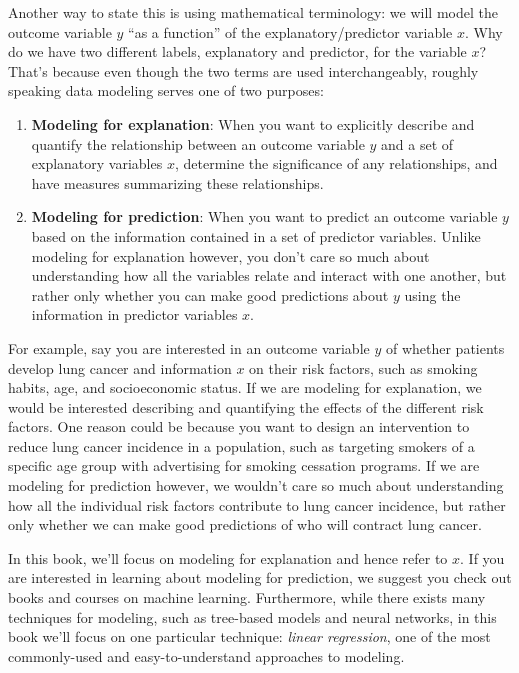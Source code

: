 \documentclass[12pt, krantz2,]{krantz}
\providecommand{\tightlist}{%
  \setlength{\itemsep}{0pt}\setlength{\parskip}{0pt}}
\begin{document}
Another way to state this is using mathematical terminology: we will model the outcome variable \(y\) ``as a function'' of the explanatory/predictor variable \(x\). Why do we have two different labels, explanatory and predictor, for the variable \(x\)? That's because even though the two terms are used interchangeably, roughly speaking data modeling serves one of two purposes:

\begin{enumerate}
\def\labelenumi{\arabic{enumi}.}
\tightlist
\item
  \textbf{Modeling for explanation}: When you want to explicitly describe and quantify the relationship between an outcome variable \(y\) and a set of explanatory variables \(x\), determine the significance of any relationships, and have measures summarizing these relationships.
\item
  \textbf{Modeling for prediction}: When you want to predict an outcome variable \(y\) based on the information contained in a set of predictor variables. Unlike modeling for explanation however, you don't care so much about understanding how all the variables relate and interact with one another, but rather only whether you can make good predictions about \(y\) using the information in predictor variables \(x\).
\end{enumerate}

For example, say you are interested in an outcome variable \(y\) of whether patients develop lung cancer and information \(x\) on their risk factors, such as smoking habits, age, and socioeconomic status. If we are modeling for explanation, we would be interested describing and quantifying the effects of the different risk factors. One reason could be because you want to design an intervention to reduce lung cancer incidence in a population, such as targeting smokers of a specific age group with advertising for smoking cessation programs. If we are modeling for prediction however, we wouldn't care so much about understanding how all the individual risk factors contribute to lung cancer incidence, but rather only whether we can make good predictions of who will contract lung cancer.

In this book, we'll focus on modeling for explanation and hence refer to \(x\). If you are interested in learning about modeling for prediction, we suggest you check out books and courses on machine learning. Furthermore, while there exists many techniques for modeling, such as tree-based models and neural networks, in this book we'll focus on one particular technique: \emph{linear regression}, one of the most commonly-used and easy-to-understand approaches to modeling.
\end{document}
